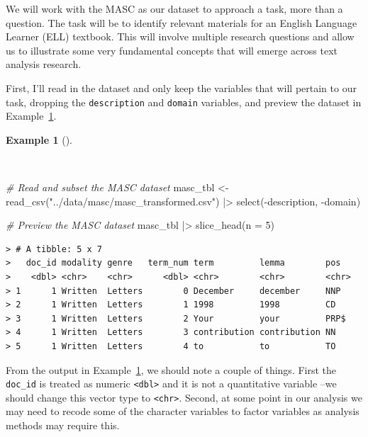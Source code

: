 \documentclass[
  letterpaper,
  DIV=11,
  numbers=noendperiod]{scrreport}
\newenvironment{Shaded}{\begin{snugshade}}{\end{snugshade}}
\newcommand{\AttributeTok}[1]{\textcolor[rgb]{0.00,0.00,0.00}{#1}}
\newcommand{\CommentTok}[1]{\textcolor[rgb]{0.00,0.00,0.00}{\textit{#1}}}
\newcommand{\DecValTok}[1]{\textcolor[rgb]{0.00,0.00,0.00}{#1}}
\newcommand{\FunctionTok}[1]{\textcolor[rgb]{0.00,0.00,0.00}{#1}}
\newcommand{\NormalTok}[1]{\textcolor[rgb]{0.00,0.00,0.00}{#1}}
\newcommand{\OtherTok}[1]{\textcolor[rgb]{0.00,0.00,0.00}{#1}}
\newcommand{\SpecialCharTok}[1]{\textcolor[rgb]{0.00,0.00,0.00}{#1}}
\newcommand{\StringTok}[1]{\textcolor[rgb]{0.00,0.00,0.00}{#1}}
\theoremstyle{definition}
\newtheorem{example}{Example}[chapter]
\theoremstyle{remark}
\begin{document}
We will work with the MASC as our dataset to approach a task, more than
a question. The task will be to identify relevant materials for an
English Language Learner (ELL) textbook. This will involve multiple
research questions and allow us to illustrate some very fundamental
concepts that will emerge across text analysis research.

First, I'll read in the dataset and only keep the variables that will
pertain to our task, dropping the \texttt{description} and
\texttt{domain} variables, and preview the dataset in
Example~\ref{exm-eda-masc-read}.

\begin{example}[]\protect\hypertarget{exm-eda-masc-read}{}\label{exm-eda-masc-read}

~

\begin{Shaded}
\begin{Highlighting}[]
\CommentTok{\# Read and subset the MASC dataset}
\NormalTok{masc\_tbl }\OtherTok{\textless{}{-}} 
  \FunctionTok{read\_csv}\NormalTok{(}\StringTok{"../data/masc/masc\_transformed.csv"}\NormalTok{) }\SpecialCharTok{|\textgreater{}} 
  \FunctionTok{select}\NormalTok{(}\SpecialCharTok{{-}}\NormalTok{description, }\SpecialCharTok{{-}}\NormalTok{domain)}

\CommentTok{\# Preview the MASC dataset}
\NormalTok{masc\_tbl }\SpecialCharTok{|\textgreater{}} 
  \FunctionTok{slice\_head}\NormalTok{(}\AttributeTok{n =} \DecValTok{5}\NormalTok{)}
\end{Highlighting}
\end{Shaded}

\begin{verbatim}
> # A tibble: 5 x 7
>   doc_id modality genre   term_num term         lemma        pos  
>    <dbl> <chr>    <chr>      <dbl> <chr>        <chr>        <chr>
> 1      1 Written  Letters        0 December     december     NNP  
> 2      1 Written  Letters        1 1998         1998         CD   
> 3      1 Written  Letters        2 Your         your         PRP$ 
> 4      1 Written  Letters        3 contribution contribution NN   
> 5      1 Written  Letters        4 to           to           TO
\end{verbatim}

\end{example}

From the output in Example~\ref{exm-eda-masc-read}, we should note a
couple of things. First the \texttt{doc\_id} is treated as numeric
\texttt{\textless{}dbl\textgreater{}} and it is not a quantitative
variable --we should change this vector type to
\texttt{\textless{}chr\textgreater{}}. Second, at some point in our
analysis we may need to recode some of the character variables to factor
variables as analysis methods may require this.
\end{document}
